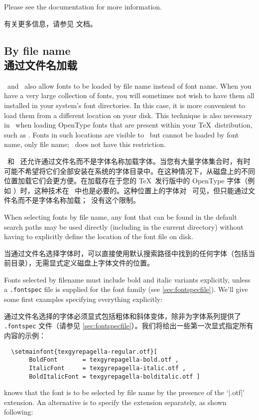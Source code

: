 \documentclass[a4paper]{l3doc}
\begin{document}
Please see the  documentation for more information.

有关更多信息，请参见  文档。


\subsection{By file name\\通过文件名加载}
\label{sec:by-file-name}

\XeTeX\ and \LuaTeX\ also allow fonts to be loaded by file name instead of font name.
When you have a very large collection of fonts, you will sometimes not
wish to have them all installed in your system's font directories.
In this case, it is more convenient to load them from a different location on your disk.
This technique is also necessary in \XeTeX\ when loading OpenType fonts that are present within your \TeX\ distribution, such as .
Fonts in such locations are visible to \XeTeX\ but cannot be loaded by font name, only file name; \LuaTeX\ does not have this restriction.

\XeTeX\ 和 \LuaTeX\ 还允许通过文件名而不是字体名称加载字体。当您有大量字体集合时，有时可能不希望将它们全部安装在系统的字体目录中。在这种情况下，从磁盘上的不同位置加载它们会更方便。在加载存在于您的 \TeX\ 发行版中的 OpenType 字体（例如 ）时，这种技术在 \XeTeX\ 中也是必要的。这种位置上的字体对 \XeTeX\ 可见，但只能通过文件名而不是字体名称加载；\LuaTeX\ 没有这个限制。

When selecting fonts by file name, any font that can be found in the default
search paths may be used directly (including in the current directory)
without having to explicitly define the location of the font file on disk.

当通过文件名选择字体时，可以直接使用默认搜索路径中找到的任何字体（包括当前目录），无需显式定义磁盘上字体文件的位置。


Fonts selected by filename must include bold and italic variants explicitly,
unless a \texttt{.fontspec} file is supplied for the font family (see \ref{sec:fontspecfile}).
We'll give some first examples specifying everything explicitly:

通过文件名选择的字体必须显式包括粗体和斜体变体，除非为字体系列提供了 \texttt{.fontspec} 文件（请参见 \ref{sec:fontspecfile}）。我们将给出一些第一次显式指定所有内容的示例：

\begin{Verbatim}
  \setmainfont{texgyrepagella-regular.otf}[
       BoldFont       = texgyrepagella-bold.otf ,
       ItalicFont     = texgyrepagella-italic.otf ,
       BoldItalicFont = texgyrepagella-bolditalic.otf ]
\end{Verbatim}
 knows that the font is to be selected by file name by the
presence of the `|.otf|' extension.
An alternative is to specify the extension separately, as shown following:
\end{document}

